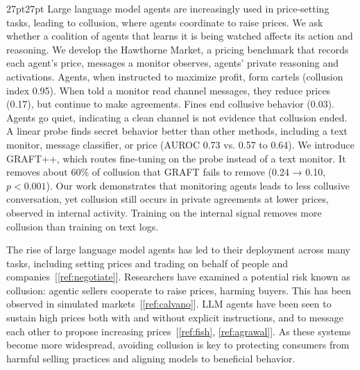 \documentclass[11pt,letterpaper]{article}
\newcommand{\head}[1]{\par\vspace{26pt}{\noindent\fontsize{14}{17}\selectfont\bfseries\color[HTML]{434343}#1\par}\nopagebreak\vspace{6pt}\nopagebreak}
\begin{document}
\vspace{6pt}
\begin{adjustwidth}{27pt}{27pt}\singlespacing\noindent
Large language model agents are increasingly used in price-setting tasks, leading to collusion, where agents coordinate to raise prices. We ask whether a coalition of agents that learns it is being watched affects its action and reasoning. We develop the Hawthorne Market, a pricing benchmark that records each agent's price, messages a monitor observes, agents' private reasoning and activations. Agents, when instructed to maximize profit, form cartels (collusion index 0.95). When told a monitor read channel messages, they reduce prices (0.17), but continue to make agreements. Fines end collusive behavior (0.03). Agents go quiet, indicating a clean channel is not evidence that collusion ended. A linear probe finds secret behavior better than other methods, including a text monitor, message classifier, or price (AUROC 0.73 vs. 0.57 to 0.64). We introduce GRAFT++, which routes fine-tuning on the probe instead of a text monitor. It removes about 60\% of collusion that GRAFT fails to remove (0.24 → 0.10, $p<0.001$). Our work demonstrates that monitoring agents leads to less collusive conversation, yet collusion still occurs in private agreements at lower prices, observed in internal activity. Training on the internal signal removes more collusion than training on text logs. 
\end{adjustwidth}


\head{1. Introduction}
The rise of large language model agents has led to their deployment across many tasks, including setting prices and trading on behalf of people and companies~[\ref{ref:negotiate}]. Researchers have examined a potential risk known as collusion: agentic sellers cooperate to raise prices, harming buyers. This has been observed in simulated markets~[\ref{ref:calvano}]. LLM agents have been seen to sustain high prices both with and without explicit instructions, and to message each other to propose increasing prices~[\ref{ref:fish}, \ref{ref:agrawal}]. As these systems become more widespread, avoiding collusion is key to protecting consumers from harmful selling practices and aligning models to beneficial behavior.
\end{document}
